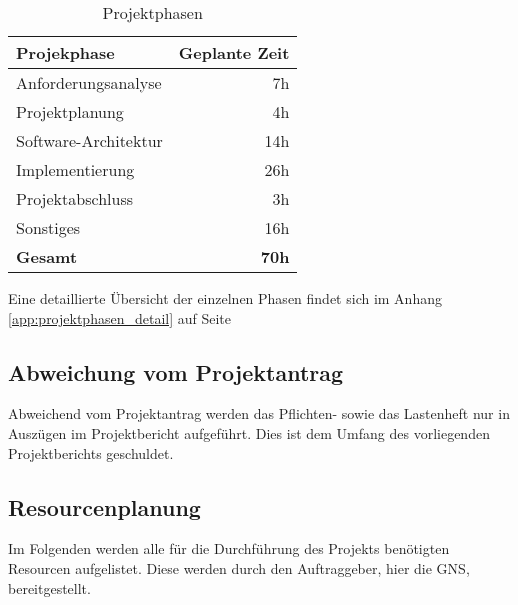 \documentclass[12pt, xcolor=dvipsnames]{scrartcl}
\begin{document}
	\begin{table}[H]
	\centering
	\begin{tabular}{lr}

		\rowcolor{white!15}				
		\textbf{Projekphase} & \textbf{Geplante Zeit} \\\hline
		
	    Anforderungsanalyse & 7h \\	   	   
	    Projektplanung & 4h \\	   			
	    Software-Architektur & 14h \\	 				
	    Implementierung & 26h \\	   				
	    Projektabschluss & 3h \\	   				
	    Sonstiges & 16h \\\hline
	  		
		\rowcolor{white!15}				
		\textbf{Gesamt} & \textbf{70h}				
			    
	\end{tabular}
	\caption{Projektphasen}
	\label{tab:projektphasen}
	\end{table}
	
	Eine detaillierte Übersicht der einzelnen Phasen findet sich im Anhang \ref{app:projektphasen_detail} auf Seite \pageref{app:projektphasen_detail}
	

\subsection{Abweichung vom Projektantrag}

Abweichend vom Projektantrag werden das Pflichten- sowie das Lastenheft nur in Auszügen im Projektbericht aufgeführt. Dies ist dem Umfang des vorliegenden Projektberichts geschuldet.

\subsection{Resourcenplanung}

Im Folgenden werden alle für die Durchführung des Projekts benötigten Resourcen aufgelistet. Diese werden durch den Auftraggeber, hier die GNS, bereitgestellt.
\end{document}
